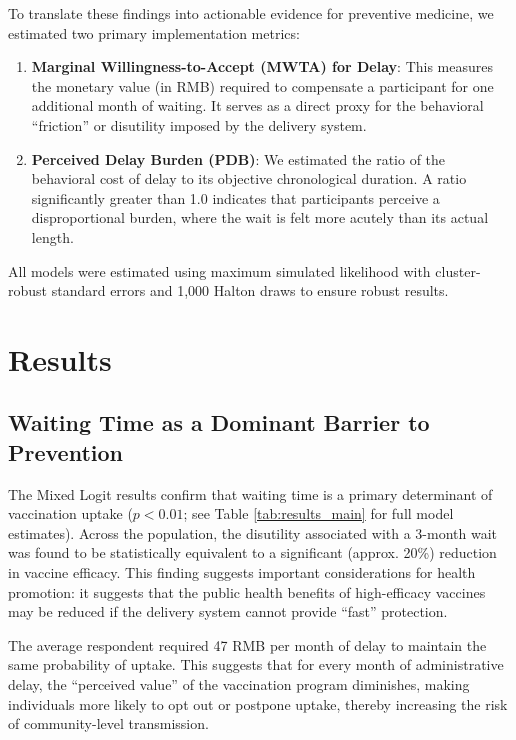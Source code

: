 \documentclass[preprint,12pt,authoryear]{elsarticle}
\begin{document}
To translate these findings into actionable evidence for preventive medicine, we estimated two primary implementation metrics:
\begin{enumerate}
    \item \textbf{Marginal Willingness-to-Accept (MWTA) for Delay}: This measures the monetary value (in RMB) required to compensate a participant for one additional month of waiting. It serves as a direct proxy for the behavioral ``friction'' or disutility imposed by the delivery system.
    \item \textbf{Perceived Delay Burden (PDB)}: We estimated the ratio of the behavioral cost of delay to its objective chronological duration. A ratio significantly greater than 1.0 indicates that participants perceive a disproportional burden, where the wait is felt more acutely than its actual length.
\end{enumerate}
All models were estimated using maximum simulated likelihood with cluster-robust standard errors and 1,000 Halton draws to ensure robust results.

\section{Results}
\subsection{Waiting Time as a Dominant Barrier to Prevention}
The Mixed Logit results confirm that waiting time is a primary determinant of vaccination uptake ($p < 0.01$; see Table \ref{tab:results_main} for full model estimates). Across the population, the disutility associated with a 3-month wait was found to be statistically equivalent to a significant (approx. 20\%) reduction in vaccine efficacy. This finding suggests important considerations for health promotion: it suggests that the public health benefits of high-efficacy vaccines may be reduced if the delivery system cannot provide ``fast'' protection.

The average respondent required 47 RMB per month of delay to maintain the same probability of uptake. This suggests that for every month of administrative delay, the ``perceived value'' of the vaccination program diminishes, making individuals more likely to opt out or postpone uptake, thereby increasing the risk of community-level transmission.
\end{document}
